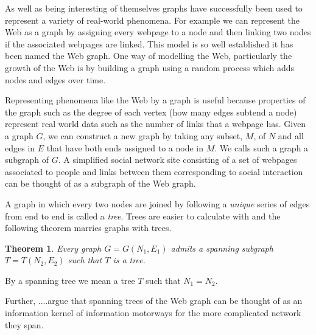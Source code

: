 \documentclass[a1,portrait]{a0poster}
\newtheorem{thm}{Theorem}
\begin{document}
\begin{textblock}{8}
As well as being interesting of themselves graphs have  successfully  been used to represent  a variety of real-world phenomena.  For example we can represent the Web as a graph by assigning every webpage to a node and then linking two nodes if the associated webpages are linked.  This model is so well established it has been named the Web graph. One way of modelling the Web, particularly the growth of the Web is by building a graph using a random process which adds nodes and edges over time.  

Representing phenomena like the Web by a graph is useful because properties of the graph such as the degree of each vertex (how many edges subtend a node) represent real world data such as the number of links that a webpage has.  Given a graph $G$, we can construct a new graph by taking any subset, $M$, of $N$ and all edges in $E$ that have both ends assigned to a node in $M$.  We calls such a graph a subgraph of $G$.  A simplified social network site consisting of a set of webpages associated to people and links between them corresponding to social interaction can be thought of as a subgraph of the Web graph.

A graph in which every two nodes are joined by following a \emph{unique} series of edges from end to end is called a \emph{tree}.  Trees are easier to calculate with and the following theorem marries graphs with trees.

\begin{thm}
Every graph $G = G(N_{1},E_{1})$ admits a spanning subgraph $T = T(N_{2},E_{2})$ such that $T$ is a tree.  
\end{thm}
By a spanning tree we mean a tree $T$ such that $N_{1} = N_{2}$.

Further, ....argue that spanning trees of the Web graph can be thought of as an information kernel of information motorways for the more complicated network they span. 



\end{textblock}
\end{document}
